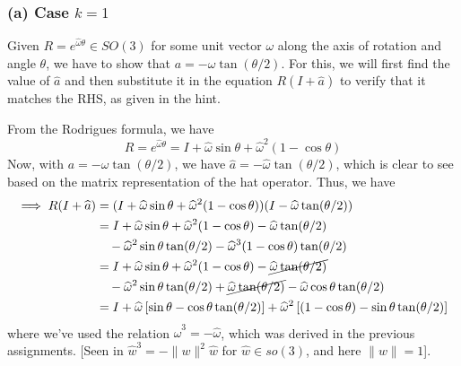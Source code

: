\subsubsection*{(a) Case \( k=1 \)}

Given \( R = e^{\widehat{\omega} \theta} \in SO(3) \) for some unit vector \( \omega \) along the axis of rotation and angle \( \theta \), we have to show that \( a = -\omega \tan(\theta / 2) \).
For this, we will first find the value of \( \widehat{a} \) and then substitute it in the equation \( R(I + \widehat{a}) \) to verify that it matches the RHS, as given in the hint.

From the Rodrigues formula, we have
\begin{equation*}
    R = e^{\widehat{\omega} \theta} = I + \widehat{\omega} \sin \theta + \widehat{\omega}^{2} (1 - \cos \theta)
\end{equation*}
Now, with \( a = -\omega \tan(\theta / 2) \), we have \( \widehat{a} = -\widehat{\omega} \tan(\theta / 2) \), which is clear to see based on the matrix representation of the hat operator.
Thus, we have
\begin{align*}
    \implies
    R(I + \widehat{a})
     & =
    (I + \widehat{\omega} \sin \theta + \widehat{\omega}^{2} (1 - \cos \theta))(I - \widehat{\omega} \tan(\theta / 2))
    \\ & =
    I + \widehat{\omega} \sin \theta + \widehat{\omega}^{2} (1 - \cos \theta) - \widehat{\omega} \tan(\theta / 2)
    \\ & \quad
    - \widehat{\omega}^{2} \sin \theta \tan(\theta / 2) - \widehat{\omega}^{3} (1 - \cos \theta) \tan(\theta / 2)
    \\ & =
    I + \widehat{\omega} \sin \theta + \widehat{\omega}^{2} (1 - \cos \theta) - \cancel{\widehat{\omega} \tan(\theta / 2)}
    \\ & \quad
    - \widehat{\omega}^{2} \sin \theta \tan(\theta / 2) + \cancel{\widehat{\omega} \tan(\theta / 2)} - \widehat{\omega} \cos \theta \tan(\theta / 2)
    \\ & =
    I + \widehat{\omega} \left[ \sin \theta - \cos \theta \tan(\theta / 2) \right] + \widehat{\omega}^{2} \left[(1 - \cos \theta) - \sin \theta \tan(\theta / 2) \right]
\end{align*}
where we've used the relation \( \widehat{\omega}^{3} = -\widehat{\omega} \), which was derived in the previous assignments.
[Seen in \( \hat{w}^{3}=-\|w\|^{2} \hat{w} \) for \( \hat{w} \in so(3) \), and here \( \|w\|=1 \)].

